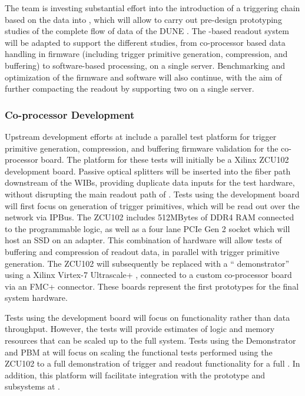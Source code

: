 The  team is investing substantial effort into the introduction of
a triggering chain based on the  data into , which will
allow to carry out pre-design prototyping studies of the complete flow
of data of the DUNE .  
The -based readout system will be adapted to support the
different studies, from co-processor based data handling in firmware
(including trigger primitive generation, compression, and buffering) to software-based processing, on a single
server. Benchmarking and optimization of the  firmware and
software will also continue, with the aim of further compacting the
readout by supporting two  on a single server. 

\subsubsection{Co-processor Development}


Upstream  development efforts at  include a parallel test platform for trigger primitive generation, compression, and buffering firmware validation for the  co-processor board. The platform for these tests will initially be a Xilinx ZCU102 development board. Passive optical splitters will be inserted into the fiber path downstream of the WIBs, providing duplicate data inputs for the test hardware, without disrupting the main readout path of . Tests using the development board will first focus on generation of trigger primitives, which will be read out over the network via IPBus\cite{Larrea:2015wra}. The ZCU102 includes 512MBytes of DDR4 RAM connected to the  programmable logic, as well as a four lane PCIe Gen 2 socket which will host an  SSD on an adapter. This combination of hardware will allow tests of buffering and compression of readout data, in parallel with trigger primitive generation. The ZCU102 will subsequently be replaced with a `` demonstrator'' using a Xilinx Virtex-7 Ultrascale+ , connected to a custom  co-processor board via an FMC+ connector. These boards represent the first prototypes for the final system hardware.

Tests using the development board will focus on functionality rather than data throughput. However, the tests will provide estimates of  logic and memory resources that can be scaled up to the full system. Tests using the  Demonstrator and PBM at  will focus on scaling the functional tests performed using the ZCU102 to a full demonstration of trigger and readout functionality for a full . In addition, this platform will facilitate integration with the prototype  and  subsystems at . 

